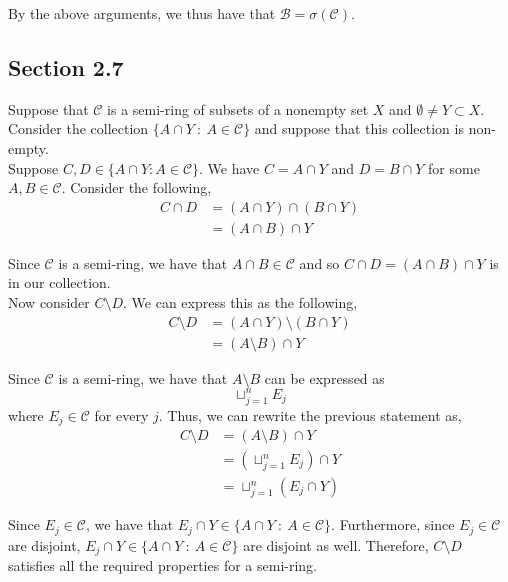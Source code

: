\documentclass[12pt]{article}
\newenvironment{problem}[2][Problem]{\begin{trivlist}
\item[\hskip \labelsep {\bfseries #1}\hskip \labelsep {\bfseries #2.}]}{\end{trivlist}}
\begin{document}
By the above arguments, we thus have that $\mathcal{B} = \sigma(\mathcal{C})$.

\subsection{Section 2.7}

\begin{problem}{1}
\end{problem}

Suppose that $\mathcal{C}$ is a semi-ring of subsets of a nonempty set $X$ and $\emptyset \neq Y \subset X$. Consider the collection $\{A \cap Y \ : \ A \in \mathcal{C} \}$ and suppose that this collection is non-empty.\\

Suppose $C, D \in \{A \cap Y : A \in \mathcal{C} \}$. We have $C = A \cap Y$ and $D = B \cap Y$ for some $A, B \in \mathcal{C}$. Consider the following,
\begin{align*}
C \cap D &= (A \cap Y) \cap (B \cap Y)\\
&= (A \cap B) \cap Y
\end{align*}

Since $\mathcal{C}$ is a semi-ring, we have that $A \cap B \in \mathcal{C}$ and so $C \cap D = (A \cap B) \cap Y$ is in our collection.\\

Now consider $C \setminus D$. We can express this as the following,
\begin{align*}
C \setminus D &= (A \cap Y) \setminus (B \cap Y)\\
&= (A \setminus B) \cap Y
\end{align*}

Since $\mathcal{C}$ is a semi-ring, we have that $A \setminus B$ can be expressed as $$\sqcup_{j=1}^n E_j$$ where $E_j \in \mathcal{C}$ for every $j$. Thus, we can rewrite the previous statement as,
\begin{align*}
C \setminus D &= (A \setminus B) \cap Y\\
&= (\sqcup_{j=1}^n E_j) \cap Y\\
&= \sqcup_{j=1}^n (E_j \cap Y)
\end{align*}

Since $E_j \in \mathcal{C}$, we have that $E_j \cap Y \in \{A \cap Y \ : \ A \in \mathcal{C} \}$. Furthermore, since $E_j \in \mathcal{C}$ are disjoint, $E_j \cap Y \in \{A \cap Y \ : \ A \in \mathcal{C} \}$ are disjoint as well. Therefore, $C \setminus D$ satisfies all the required properties for a semi-ring.\\
\end{document}
